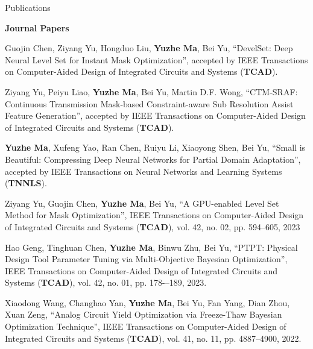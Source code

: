 \begin{rSection}{Publications}

\iffalse
\textbf{Books / Book Chapters}
\begin{description}[font=\normalfont]

\end{description}
\fi

\textbf{Journal Papers}
\begin{description}[font=\normalfont]
\iffalse
\item \textbf{Submitted}

\fi

\item[{[J22]}] {
    Guojin Chen, Ziyang Yu, Hongduo Liu, \textbf{Yuzhe Ma}, Bei Yu, 
    ``DevelSet: Deep Neural Level Set for Instant Mask Optimization'',
    accepted by IEEE Transactions on Computer-Aided Design of Integrated Circuits and Systems (\textbf{TCAD}).
}

\item[{[J21]}] {
    Ziyang Yu, Peiyu Liao, \textbf{Yuzhe Ma}, Bei Yu, Martin D.F. Wong, 
    ``CTM-SRAF: Continuous Transmission Mask-based Constraint-aware Sub Resolution Assist Feature Generation'',
    accepted by IEEE Transactions on Computer-Aided Design of Integrated Circuits and Systems (\textbf{TCAD}).
}

\item[{[J20]}] {
    \textbf{Yuzhe Ma}, Xufeng Yao, Ran Chen, Ruiyu Li, Xiaoyong Shen, Bei Yu, 
    ``Small is Beautiful: Compressing Deep Neural Networks for Partial Domain Adaptation'',
    accepted by IEEE Transactions on Neural Networks and Learning Systems (\textbf{TNNLS}).
}

\item[{[J19]}] {
    Ziyang Yu, Guojin Chen, \textbf{Yuzhe Ma}, Bei Yu, 
    ``A GPU-enabled Level Set Method for Mask Optimization'',
    IEEE Transactions on Computer-Aided Design of Integrated Circuits and Systems (\textbf{TCAD}), vol. 42, no. 02, pp. 594--605, 2023
}

\item[{[J18]}] {
    Hao Geng, Tinghuan Chen, \textbf{Yuzhe Ma}, Binwu Zhu, Bei Yu, 
    ``PTPT: Physical Design Tool Parameter Tuning via Multi-Objective Bayesian Optimization'',
    IEEE Transactions on Computer-Aided Design of Integrated Circuits and Systems (\textbf{TCAD}), vol. 42, no. 01, pp. 178-–189, 2023.
}

\item[{[J17]}] {
    Xiaodong Wang, Changhao Yan, \textbf{Yuzhe Ma}, Bei Yu, Fan Yang, Dian Zhou, Xuan Zeng, 
    ``Analog Circuit Yield Optimization via Freeze-Thaw Bayesian Optimization Technique'',
    IEEE Transactions on Computer-Aided Design of Integrated Circuits and Systems (\textbf{TCAD}), vol. 41, no. 11, pp. 4887--4900, 2022.
}


\end{description}
\end{rSection}
